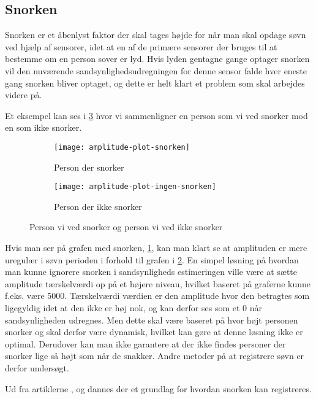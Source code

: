 \subsection{Snorken}\label{section:snorken}
Snorken er et åbenlyst faktor der skal tages højde for når man skal opdage søvn ved hjælp af sensorer, idet at en af de primære sensorer der bruges til at bestemme om en person sover er lyd.
Hvis lyden gentagne gange optager snorken vil den nuværende sandsynlighedsudregningen for denne sensor falde hver eneste gang snorken bliver optaget, og dette er helt klart et problem som skal arbejdes videre på.

Et eksempel kan ses i \cref{fig:snorke-vs-ikkesnorken} hvor vi sammenligner en person som vi ved snorker mod en som ikke snorker.

\begin{figure}[h]
\begin{subfigure}{0.49\textwidth}
\texttt{[image: amplitude-plot-snorken]}
\caption{Person der snorker}
\label{fig:person-snorker}
\end{subfigure}
\begin{subfigure}{0.49\textwidth}
\texttt{[image: amplitude-plot-ingen-snorken]}
\caption{Person der ikke snorker}
\label{fig:person-ikke-snorker}
\end{subfigure}
\caption{Person vi ved snorker og person vi ved ikke snorker}
\label{fig:snorke-vs-ikkesnorken}
\end{figure}

Hvis man ser på grafen med snorken, \cref{fig:person-snorker}, kan man klart se at amplituden er mere uregulær i søvn perioden i forhold til grafen i \cref{fig:person-ikke-snorker}. 
En simpel løsning på hvordan man kunne ignorere snorken i sandsynligheds estimeringen ville være at sætte amplitude tærskelværdi op på et højere niveau, hvilket baseret på graferne kunne f.eks. være 5000. 
Tærskelværdi værdien er den amplitude hvor den betragtes som ligegyldig idet at den ikke er høj nok, og kan derfor ses som et 0 når sandsynligheden udregnes. 
Men dette skal være baseret på hvor højt personen snorker og skal derfor være dynamisk, hvilket kan gøre at denne løsning ikke er optimal. Derudover kan man ikke garantere at der ikke findes personer der snorker lige så højt som når de snakker.
Andre metoder på at registrere søvn er derfor undersøgt.

Ud fra artiklerne \citet{Dafna2013}, \citet{Calabrese20111101} og \citet{7051338} dannes der et grundlag for hvordan snorken kan registreres.

